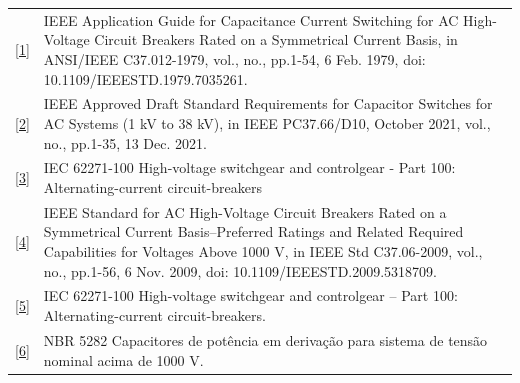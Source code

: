 \documentclass[a4paper]{article}
\begin{document}
\noindent
\begin{tabular}{p{0.2cm} p{15.8cm}}
    \href{https://ieeexplore.ieee.org/document/7035261}{[1]} &
    \begin{minipage}[t]{15.8cm}
        IEEE Application Guide for Capacitance Current Switching for AC High-Voltage Circuit Breakers Rated on a Symmetrical Current Basis, in ANSI/IEEE C37.012-1979, vol., no., pp.1-54, 6 Feb. 1979, doi: 10.1109/IEEESTD.1979.7035261.
    \end{minipage} \\

    \href{https://ieeexplore.ieee.org/document/9574631}{[2]} &
    \begin{minipage}[t]{15.8cm}
        IEEE Approved Draft Standard Requirements for Capacitor Switches for AC Systems (1 kV to 38 kV), in IEEE PC37.66/D10, October 2021, vol., no., pp.1-35, 13 Dec. 2021.
    \end{minipage} \\


    \href{https://webstore.iec.ch/publication/62785}{[3]} &
    \begin{minipage}[t]{15.8cm}
       IEC 62271-100 High-voltage switchgear and controlgear - Part 100: Alternating-current circuit-breakers
    \end{minipage} \\

    \href{https://ieeexplore.ieee.org/document/5318709}{[4]} &
    \begin{minipage}[t]{15.8cm}
        IEEE Standard for AC High-Voltage Circuit Breakers Rated on a Symmetrical Current Basis--Preferred Ratings and Related Required Capabilities for Voltages Above 1000 V, in IEEE Std C37.06-2009, vol., no., pp.1-56, 6 Nov. 2009, doi: 10.1109/IEEESTD.2009.5318709.
    \end{minipage} \\

    \href{https://cdn.standards.iteh.ai/samples/101972/4e7e06bd66d2443da668b8e0c6c60512/IEC-62271-100-2021.pdf}{[5]} &
    \begin{minipage}[t]{15.8cm}
        IEC 62271-100 High-voltage switchgear and controlgear – Part 100: Alternating-current circuit-breakers.
    \end{minipage} \\

    \href{https://www.normas.com.br/autorizar/visualizacao-nbr/313/identificar/visitante}{[6]} &
    \begin{minipage}[t]{15.8cm}
        NBR 5282 Capacitores de potência em derivação para sistema de tensão nominal acima de 1000 V.
    \end{minipage} \\
\end{tabular}
\end{document}
